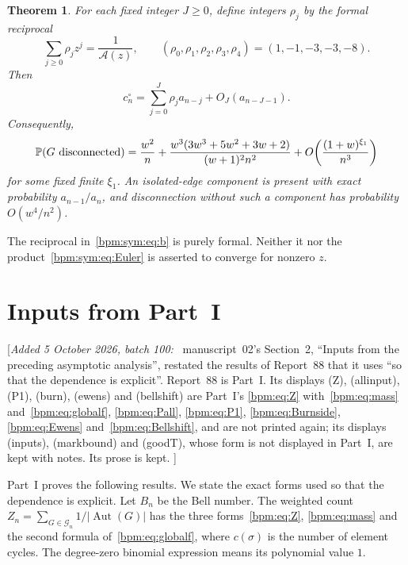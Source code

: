 \documentclass[11pt,a4paper]{article}
\newtheorem{theorem}{Theorem}[section]\newtheorem{lemma}[theorem]{Lemma}\newtheorem{proposition}[theorem]{Proposition}
\theoremstyle{remark}\newtheorem{remark}[theorem]{Remark}%
\newcommand{\Aut}{\operatorname{Aut}}\newcommand{\ee}{\mathrm e}
\newenvironment{writenote}{\par\smallskip\noindent\small[\textit{Added 5 October 2026, batch 100:}\ }{]\par\smallskip}
\begin{document}
\begin{theorem}\label{bpm:sym:thm:conn}
For each fixed integer $J\ge0$, define integers $\rho_j$ by the formal reciprocal
\begin{equation}\label{bpm:sym:eq:b}
 \sum_{j\ge0}\rho_jz^j=\frac1{\mathcal A(z)},\qquad
 (\rho_0,\rho_1,\rho_2,\rho_3,\rho_4)=(1,-1,-3,-3,-8).
\end{equation}
Then
\begin{equation}\label{bpm:sym:eq:shift}
 c^\circ_n=\sum_{j=0}^J \rho_j a_{n-j}+O_J(a_{n-J-1}).
\end{equation}
Consequently,
\begin{equation}\label{bpm:sym:eq:disc}
 \mathbb P(G\text{ disconnected})
 =\frac{w^2}{n}
 +\frac{w^3(3w^3+5w^2+3w+2)}{(w+1)^2n^2}
 +O\!\left(\frac{(1+w)^{\xi_1}}{n^3}\right)
\end{equation}
for some fixed finite $\xi_1$. An isolated-edge component is present with exact probability $a_{n-1}/a_n$, and disconnection without such a component has probability $O(w^4/n^2)$.
\end{theorem}
The reciprocal in~\eqref{bpm:sym:eq:b} is purely formal. Neither it nor the product~\eqref{bpm:sym:eq:Euler} is asserted to converge for nonzero $z$.

\section{Inputs from Part~I}\label{bpm:sym:sec:inputs}
\begin{writenote}
manuscript~02's Section~2, ``Inputs from the preceding asymptotic
analysis'', restated the results of Report~88 that it uses ``so that the
dependence is explicit''. Report~88 is Part~I. Its displays (Z), (allinput),
(P1), (burn), (ewens) and (bellshift) are Part~I's
\eqref{bpm:eq:Z} with~\eqref{bpm:eq:mass} and~\eqref{bpm:eq:globalf},
\eqref{bpm:eq:Pall}, \eqref{bpm:eq:P1}, \eqref{bpm:eq:Burnside},
\eqref{bpm:eq:Ewens} and~\eqref{bpm:eq:Bellshift}, and are not printed
again; its displays (inputs), (markbound) and (goodT), whose form is not
displayed in Part~I, are kept with notes. Its prose is kept.
\end{writenote}

Part~I proves the following results. We state the exact forms used so that the dependence is explicit. Let $B_n$ be the Bell number. The weighted count $Z_n=\sum_{G\in\mathcal G_n}1/|\Aut(G)|$ has the three forms~\eqref{bpm:eq:Z}, \eqref{bpm:eq:mass} and the second formula of~\eqref{bpm:eq:globalf}, where $c(\sigma)$ is the number of element cycles. The degree-zero binomial expression means its polynomial value $1$.
\end{document}
